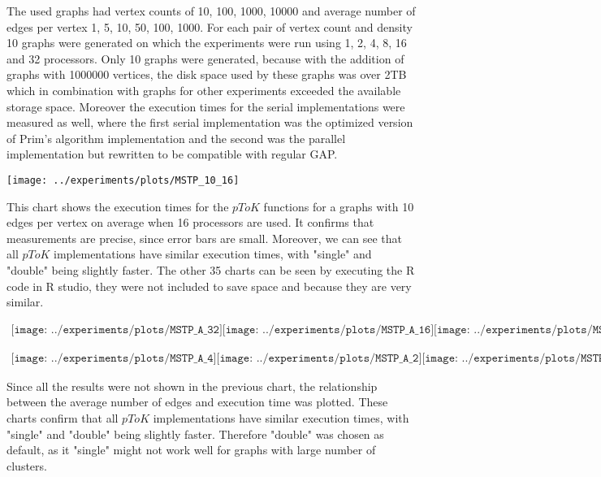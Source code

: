 \documentclass{report}
\theoremstyle{plain}
\theoremstyle{definition}
\theoremstyle{remark}
\begin{document}
The used graphs had vertex counts of 10, 100, 1000, 10000 and average number of edges per vertex 1, 5, 10, 50, 100, 1000. For each pair of vertex count and density 10 graphs were generated on which the experiments were run using 1, 2, 4, 8, 16 and 32 processors. Only 10 graphs were generated, because with the addition of graphs with 1000000 vertices, the disk space used by these graphs was over 2TB which in combination with graphs for other experiments exceeded the available storage space.
Moreover the execution times for the serial implementations were measured as well, where the first serial implementation was the optimized version of Prim's algorithm implementation and the second was the parallel implementation but rewritten to be compatible with regular GAP.

\texttt{[image: ../experiments/plots/MSTP\_10\_16]}

This chart shows the execution times for the $pToK$ functions for a graphs with 10 edges per vertex on average when 16 processors are used. It confirms that measurements are precise, since error bars are small. Moreover, we can see that all $pToK$ implementations have similar execution times, with "single" and "double" being slightly faster. The other 35 charts can be seen by executing the R code in R studio, they were not included to save space and because they are very similar.

\begin{center}
$
\begin{array}{cc}
\texttt{[image: ../experiments/plots/MSTP\_A\_32]}
\texttt{[image: ../experiments/plots/MSTP\_A\_16]}
\texttt{[image: ../experiments/plots/MSTP\_A\_8]}
\end{array}
$

\center
$
\begin{array}{cc}
\texttt{[image: ../experiments/plots/MSTP\_A\_4]}
\texttt{[image: ../experiments/plots/MSTP\_A\_2]}
\texttt{[image: ../experiments/plots/MSTP\_A\_1]}
\end{array}
$
\end{center}

Since all the results were not shown in the previous chart, the relationship between the average number of edges and execution time was plotted. These charts confirm that all $pToK$ implementations have similar execution times, with "single" and "double" being slightly faster. Therefore "double" was chosen as default, as it "single" might not work well for graphs with large number of clusters.
\end{document}
